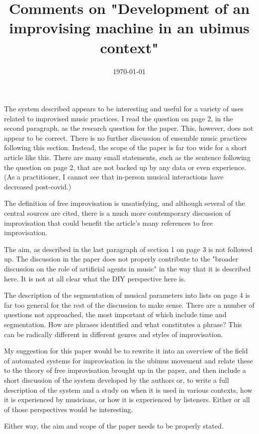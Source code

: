 \documentclass[11pt]{article}
\date{\today}
\title{Comments on "Development of an improvising machine in an ubimus context"}
\begin{document}
\maketitle
The system described appears to be interesting and useful for a variety of uses related to improvised music practices. I read the question on page 2, in the second paragraph, as the research question for the paper. This, however, does not appear to be correct. There is no further discussion of ensemble music practices following this section. Instead, the scope of the paper is far too wide for a short article like this. There are many small statements, such as the sentence following the question on page 2, that are not backed up by any data or even experience. (As a practitioner, I cannot see that in-person musical interactions have decreased post-covid.)

The definition of free improvisation is unsatisfying, and although several of the central sources are cited, there is a much more contemporary discussion of improvisation that could benefit the article's many references to free improvisation.

The aim, as described in the last paragraph of section 1 on page 3 is not followed up. The discussion in the paper does not properly contribute to the "broader discussion on the role of artificial agents in music" in the way that it is described here. It is not at all clear what the DIY perspective here is.

The description of the segmentation of musical parameters into lists on page 4 is far too general for the rest of the discussion to make sense. There are a number of questions not approached, the most important of which include time and segmentation. How are phrases identified and what constitutes a phrase? This can be radically different in different genres and styles of improvisation.

My suggestion for this paper would be to rewrite it into an overview of the field of automated systems for improvisation in the ubimus movement and relate these to the theory of free improvisation brought up in the paper, and then include a short discussion of the system developed by the authors or, to write a full description of the system and a study on when it is used in various contexts, how it is experienced by musicians, or how it is experienced by listeners. Either or all of those perspectives would be interesting.

Either way, the aim and scope of the paper needs to be properly stated.
\end{document}
